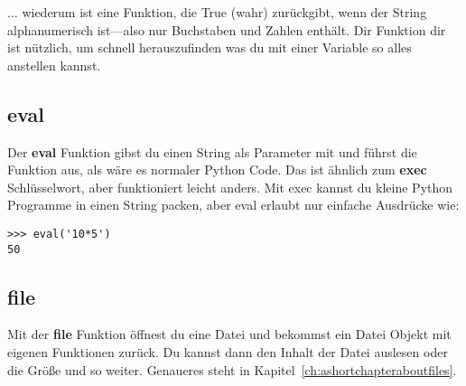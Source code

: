 $\ldots$ wiederum ist eine Funktion, die True (wahr) zurückgibt, wenn der String alphanumerisch ist---also nur Buchstaben und Zahlen enthält. Dir Funktion dir ist nützlich, um schnell herauszufinden was du mit einer Variable so alles anstellen kannst. 

\subsection*{eval}

Der \textbf{eval} Funktion gibst du einen String als Parameter mit und führst die Funktion aus, als wäre es normaler Python Code. Das ist ähnlich zum \textbf{exec} Schlüsselwort, aber funktioniert leicht anders. Mit exec kannst du kleine Python Programme in einen String packen, aber eval erlaubt nur einfache Ausdrücke wie:

\begin{Verbatim}[frame=single]
>>> eval('10*5')
50
\end{Verbatim}

\subsection*{file}

Mit der \textbf{file} Funktion öffnest du eine Datei und bekommst ein Datei Objekt mit eigenen Funktionen zurück. Du kannst dann den Inhalt der Datei auslesen oder die Größe und so weiter. Genaueres steht in Kapitel~\ref{ch:ashortchapteraboutfiles}.

